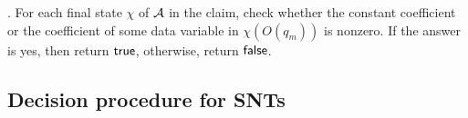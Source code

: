 . For each final state $\chi$ of ${\mathcal{A} }$ in the claim, check whether the constant coefficient or the coefficient of some data variable in $\chi(O(q_m))$ is nonzero. If the answer is yes, then return $\mathsf{true}$, otherwise, return $\mathsf{false}$.



%
%
%
%



\subsection{Decision procedure for SNTs}\label{sec-gflat}

